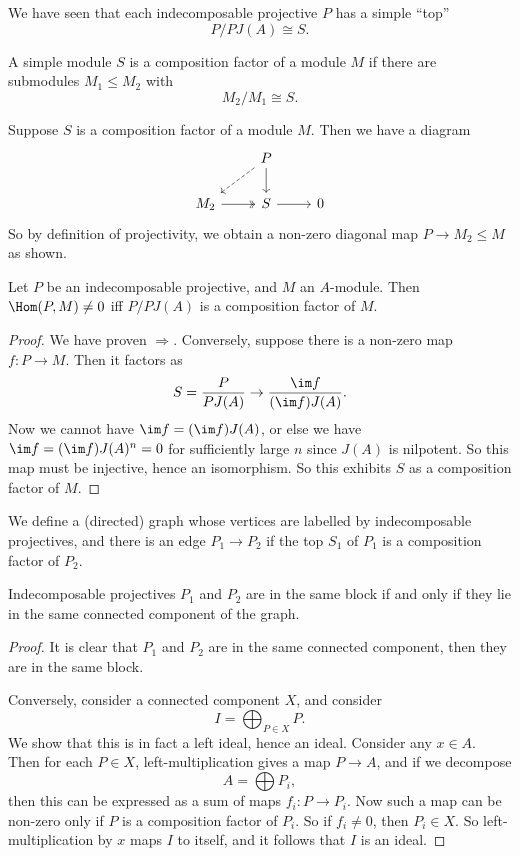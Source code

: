 \documentclass[a4paper]{article}
\begin{document}
We have seen that each indecomposable projective $P$ has a simple ``top''
\[
  P/PJ(A) \cong S.
\]
\begin{defi}
  A simple module $S$ is a composition factor of a module $M$ if there are submodules $M_1 \leq M_2$ with
  \[
    M_2/M_1 \cong S.
  \]
\end{defi}
Suppose $S$ is a composition factor of a module $M$. Then we have a diagram
\[
  \begin{tikzcd}
    & P \ar[d] \ar[dl, dashed]\\
     M_2 \ar[r, two heads ] & S \ar[r] & 0
  \end{tikzcd}
\]
So by definition of projectivity, we obtain a non-zero diagonal map $P \to M_2 \leq M$ as shown.

\begin{lemma}
  Let $P$ be an indecomposable projective, and $M$ an $A$-module. Then $\Hom(P, M) \not= 0$ iff $P/P J(A)$ is a composition factor of $M$.
\end{lemma}

\begin{proof}
  We have proven $\Rightarrow$. Conversely, suppose there is a non-zero map $f: P \to M$. Then it factors as
  \[
    S = \frac{P}{PJ(A)} \to \frac{\im f}{(\im f)J(A)}.
  \]
  Now we cannot have $\im f = (\im f)J(A)$, or else we have $\im f = (\im f)J(A)^n = 0$ for sufficiently large $n$ since $J(A)$ is nilpotent. So this map must be injective, hence an isomorphism. So this exhibits $S$ as a composition factor of $M$.
\end{proof}

We define a (directed) graph whose vertices are labelled by indecomposable projectives, and there is an edge $P_1 \to P_2$ if the top $S_1$ of $P_1$ is a composition factor of $P_2$.
\begin{thm}
  Indecomposable projectives $P_1$ and $P_2$ are in the same block if and only if they lie in the same connected component of the graph.
\end{thm}

\begin{proof}
  It is clear that $P_1$ and $P_2$ are in the same connected component, then they are in the same block.

  Conversely, consider a connected component $X$, and consider
  \[
    I = \bigoplus_{P \in X} P.
  \]
  We show that this is in fact a left ideal, hence an ideal. Consider any $x \in A$. Then for each $P \in X$, left-multiplication gives a map $P \to A$, and if we decompose
  \[
    A = \bigoplus P_i,
  \]
  then this can be expressed as a sum of maps $f_i: P \to P_i$. Now such a map can be non-zero only if $P$ is a composition factor of $P_i$. So if $f_i \not= 0$, then $P_i \in X$. So left-multiplication by $x$ maps $I$ to itself, and it follows that $I$ is an ideal.
\end{proof}
\end{document}
